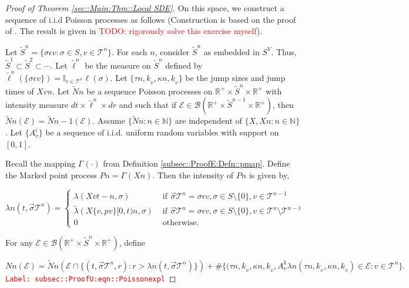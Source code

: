 \documentclass[12pt]{article}
\newcommand{\mb}{\mathbb}
\newcommand{\mc}{\mathcal}
\newcommand{\ms}{\mathscr}
\newcommand{\ov}{\overline}
\newcommand{\te}{\text}
\newcommand{\ep}{\epsilon}
\newcommand{\tr}{\textcolor{red}}
\newcommand{\labe}[1]{\tr{\texttt{Label: #1}}}
\newcommand{\ind}{\hspace{24pt}}
\renewcommand{\v}{v}							%
\renewcommand{\S}{S}							%
\newcommand{\s}{\sigma}							%
\newcommand{\sv}{\vec{\s}}						%
\newcommand{\ev}{\ep}							%
\renewcommand{\t}{t}							%
\newcommand{\X}{X}								%
\newcommand{\cl}{\ov}							%
\newcommand{\tree}{\mc{T}}						%
\newcommand{\sln}[1]{^{#1}}						%
\newcommand{\poiss}{N}							%
\newcommand{\Sm}{\ell}							%
\newcommand{\rate}{\lambda}						%
\renewcommand{\r}{r}							%
\newcommand{\alt}[1]{\widetilde{#1}}			%
\newcommand{\rt}{\tau}							%
\renewcommand{\it}{k}							%
\newcommand{\evnt}{\mc{E}}						%
\newcommand{\rv}{A}								%
\newcommand{\pmap}[1]{\Gamma_{#1}}				%
\renewcommand{\mark}{\kappa}					%
\newcommand{\rp}{P}								%
\newcommand{\crate}{\alt{\lambda}}				%
\newcommand{\p}{p}								%
\begin{document}
\begin{proof}[Proof of Theorem \ref{sec::Main:Thm::Local SDE}]
\ind On this space, we construct a sequence of i.i.d Poisson processes as follows (Construction is based on the proof of \cite[Theorem 14.7.1(b)]{DalVer08}. The result is given in \cite[Exercise 14.7.1]{DalVer08} \tr{TODO: rigorously solve this exercise myself}).

\ind Let \(\alt{\S}^n = \{\s\ev{\v}: \s\in\S,\v \in \tree\sln{n}\}\). For each \(n\), consider \(\alt{\S}^n\) as embedded in \(\S^ V\). Thus, \(\alt{\S}^1 \subset \alt{\S}^2 \subset \cdots\). Let \(\alt{\Sm}\sln{n}\) be the measure on \(\alt{\S}^n\) defined by \(\alt{\Sm}\sln{n}(\{\s\ev{\v}\}) = \mb{I}_{\v \in \tree\sln{n}}\Sm(\s)\). Let \(\{\rt{n,\it}_\v,\mark{n,\it}_{\v}\}\) be the jump sizes and jump times of \(\X{\v}{}{n}\). Let \(\alt{\poiss}{n}\) be a sequence Poisson processes on \(\mb{R}^+\times\alt{S}^n\times \mb{R}^+\) with intensity measure \(d\t\times\alt{\Sm}^n\times d\r\) and such that if \(\evnt \in \ms{B}(\mb{R}^+\times\alt{S}^{n-1}\times \mb{R}^+)\), then \(\alt{\poiss}{n}(\evnt) = \alt{\poiss}{n-1}(\evnt)\). Assume \(\{\alt{\poiss}{n}:n\in\mb{N}\}\) are independent of \(\{\X{}{},\X{}{}{n}:n\in\mb{N}\}\). Let \(\{\rv_{\v}^{i}\}\) be a sequence of i.i.d. uniform random variables with support on \([0,1]\).

\ind Recall the mapping \(\pmap{}(\cdot)\) from Definition \ref{subsec::ProofE:Defn::pmap}. Define the Marked point process \(\rp{n} = \pmap{}(\X{}{}{n})\). Then the intensity of \(\rp{n}\) is given by,

\[\rate{n}(\t,\sv{\tree\sln{n}}) = \begin{cases}
\rate{}(\X{\cl{\v}}{\t-}{n},\s) &\te{ if } \sv{\tree\sln{n}} = \s\ev{\v},\s \in \S\setminus\{0\},\v\in\tree\sln{n-1}\\
\crate{}{}(\X{\{\v,\p{\v}\}}{[0,\t)}{n},\s) &\te{ if } \sv{\tree\sln{n}} = \s\ev{\v},\s\in\S\setminus\{0\},\v\in\tree\sln{n}\setminus\tree\sln{n-1}\\
0 &\te{ otherwise.}
\end{cases}\]

For any \(\evnt \in \ms{B}(\mb{R}^+\times\alt{\S}^n\times\mb{R}^+)\), define

\begin{equation}
\poiss{n}(\evnt) = \alt{\poiss}{n}\left(\evnt\cap\{(t,\sv{\tree\sln{n}},\r):\r > \rate{n}(\t,\sv{\tree\sln{n}})\}\right) + \#\{(\rt{n,\it}_\v,\mark{n,\it}_\v,\rv_{\v}^{\it}\rate{n}(\rt{n,\it}_\v,\mark{n,\it}_\v) \in \evnt: \v\in \tree\sln{n}\}.
\label{subsec::ProofU:eqn::Poissonexpl}
\end{equation}
\labe{subsec::ProofU:eqn::Poissonexpl}


\end{proof}
\end{document}
